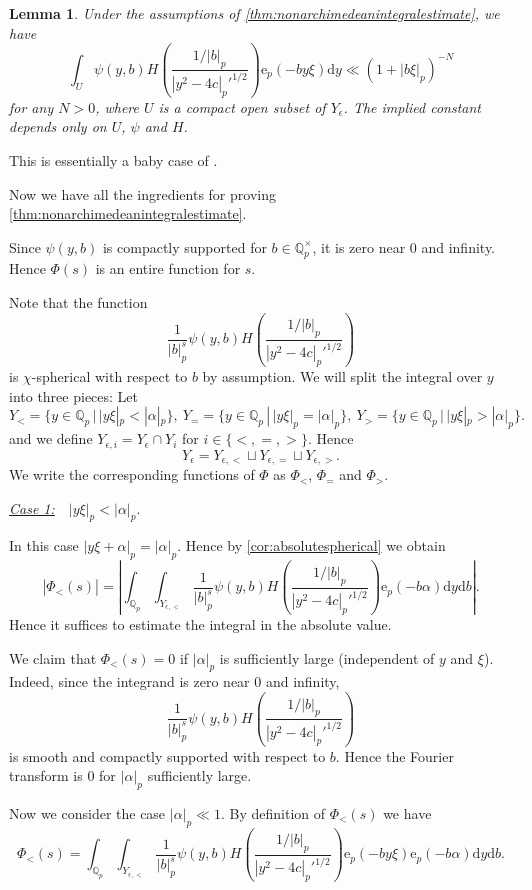 \documentclass[10pt,oneside,reqno]{amsart}
\makeatletter
\newcommand\rmd{\mathrm{d}}
\newcommand\rme{\mathrm{e}}
\newcommand\QQ{\mathbb{Q}}
\newcommand\legendresymbol[2]{\genfrac{(}{)}{}{}{#1}{#2}}
\theoremstyle{THEOREM}
\newtheorem{lemma}[theorem]{Lemma}
\theoremstyle{DEFINITION}
\theoremstyle{EXERCISE}
\numberwithin{equation}{section}
\renewenvironment{proof}[1][\proofname]{\par
  \vspace{-6pt}
  \pushQED{\qed}
  \normalfont \topsep6\p@\@plus6\p@\relax
  \trivlist
  \item[\hskip\labelsep\rmfamily\bfseries
    #1\@addpunct{:}]\ignorespaces
}{
  \popQED\endtrivlist\@endpefalse
  \vspace{-6pt}
}
\makeatother
\begin{document}
\begin{lemma}\label{lem:rapiddcay}
Under the assumptions of \autoref{thm:nonarchimedeanintegralestimate}, we have
\[
\int_{U}\psi(y,b)H\legendresymbol {1/|b|_p}{|y^2-4c|_p'^{1/2}}\rme_p(-by\xi)\rmd y\ll (1+|b\xi|_p)^{-N}
\]
for any $N>0$, where $U$ is a compact open subset of $Y_\epsilon$. The implied constant depends only on $U$, $\psi$ and $H$.
\end{lemma}
\begin{proof}
This is essentially a baby case of \cite[Lemma B.8]{cheng2025}.
\end{proof}

Now we have all the ingredients for proving  \autoref{thm:nonarchimedeanintegralestimate}.
\begin{proof}[Proof of \autoref{thm:nonarchimedeanintegralestimate}]
Since $\psi(y,b)$ is compactly supported for $b\in \QQ_p^\times$, it is zero near $0$ and infinity. Hence $\Phi(s)$ is an entire function for $s$.

Note that the function
\[
\frac{1}{|b|_p^{s}}\psi(y,b)H\legendresymbol {1/|b|_p}{|y^2-4c|_p'^{1/2}}
\]
is $\chi$-spherical with respect to $b$ by assumption. We will split the integral over $y$ into three pieces: Let
\[
Y_<=\{y\in\QQ_p\,|\, |y\xi|_p<|\alpha|_p\},\ Y_==\{y\in\QQ_p\,|\, |y\xi|_p=|\alpha|_p\},\ Y_>=\{y\in\QQ_p\,|\, |y\xi|_p>|\alpha|_p\}.
\] 
and we define $Y_{\epsilon,i}=Y_\epsilon\cap Y_i$ for $i\in\{<,=,>\}$. Hence
\[
Y_\epsilon=Y_{\epsilon,<}\sqcup Y_{\epsilon,=}\sqcup Y_{\epsilon,>}.
\]
We write the corresponding functions of $\Phi$ as $\Phi_<$, $\Phi_=$ and $\Phi_>$. 

\underline{\emph{Case 1:}}\ \ $|y\xi|_p<|\alpha|_p$.

In this case $|y\xi+\alpha|_p=|\alpha|_p$. Hence by \autoref{cor:absolutespherical} we obtain
\[
|\Phi_<(s)|=\left|\int_{\QQ_p}\int_{Y_{\epsilon,<}}\frac{1}{|b|_p^{s}}\psi(y,b)H\legendresymbol {1/|b|_p}{|y^2-4c|_p'^{1/2}}\rme_p(-b\alpha)\rmd y\rmd b\right|.
\]
Hence it suffices to estimate the integral in the absolute value.

We claim that $\Phi_<(s)=0$ if $|\alpha|_p$ is sufficiently large (independent of $y$ and $\xi$). Indeed, since the integrand is zero near $0$ and infinity,
\[
\frac{1}{|b|_p^{s}}\psi(y,b)H\legendresymbol {1/|b|_p}{|y^2-4c|_p'^{1/2}}
\]
is smooth and compactly supported with respect to $b$. Hence the Fourier transform is $0$ for $|\alpha|_p$ sufficiently large.

Now we consider the case $|\alpha|_p\ll 1$. By definition of $\Phi_<(s)$ we have
\[
\Phi_<(s)=\int_{\QQ_p}\int_{Y_{\epsilon,<}}\frac{1}{|b|_p^{s}}\psi(y,b)H\legendresymbol {1/|b|_p}{|y^2-4c|_p'^{1/2}}\rme_p(-by\xi)\rme_p(-b\alpha)\rmd y\rmd b. 
\]


\end{proof}
\end{document}
